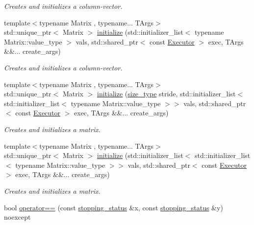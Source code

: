 \begin{DoxyCompactItemize}
\begin{DoxyCompactList}\small\item\em Creates and initializes a column-\/vector. \end{DoxyCompactList}\item 
{\footnotesize template$<$typename Matrix , typename... T\+Args$>$ }\\std\+::unique\+\_\+ptr$<$ Matrix $>$ \hyperlink{group__mat__formats_gaac5f7b4ff3b43dbc6918c687dd7d2d2e}{initialize} (std\+::initializer\+\_\+list$<$ typename Matrix\+::value\+\_\+type $>$ vals, std\+::shared\+\_\+ptr$<$ const \hyperlink{classgko_1_1Executor}{Executor} $>$ exec, T\+Args \&\&... create\+\_\+args)
\begin{DoxyCompactList}\small\item\em Creates and initializes a column-\/vector. \end{DoxyCompactList}\item 
{\footnotesize template$<$typename Matrix , typename... T\+Args$>$ }\\std\+::unique\+\_\+ptr$<$ Matrix $>$ \hyperlink{group__mat__formats_gaaf2520e5921e1bea00853c290f4fc28f}{initialize} (\hyperlink{namespacegko_a6e5c95df0ae4e47aab2f604a22d98ee7}{size\+\_\+type} stride, std\+::initializer\+\_\+list$<$ std\+::initializer\+\_\+list$<$ typename Matrix\+::value\+\_\+type $>$$>$ vals, std\+::shared\+\_\+ptr$<$ const \hyperlink{classgko_1_1Executor}{Executor} $>$ exec, T\+Args \&\&... create\+\_\+args)
\begin{DoxyCompactList}\small\item\em Creates and initializes a matrix. \end{DoxyCompactList}\item 
{\footnotesize template$<$typename Matrix , typename... T\+Args$>$ }\\std\+::unique\+\_\+ptr$<$ Matrix $>$ \hyperlink{group__mat__formats_gabe4ff67be5b3aae4e981b33ea9883385}{initialize} (std\+::initializer\+\_\+list$<$ std\+::initializer\+\_\+list$<$ typename Matrix\+::value\+\_\+type $>$$>$ vals, std\+::shared\+\_\+ptr$<$ const \hyperlink{classgko_1_1Executor}{Executor} $>$ exec, T\+Args \&\&... create\+\_\+args)
\begin{DoxyCompactList}\small\item\em Creates and initializes a matrix. \end{DoxyCompactList}\item 
bool \hyperlink{namespacegko_acf34f605deac3e475189bb5b8a0fa71a}{operator==} (const \hyperlink{classgko_1_1stopping__status}{stopping\+\_\+status} \&x, const \hyperlink{classgko_1_1stopping__status}{stopping\+\_\+status} \&y) noexcept

\end{DoxyCompactItemize}

